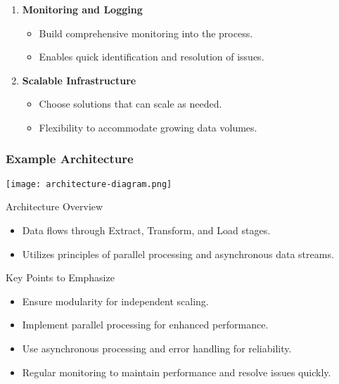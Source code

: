 \documentclass{beamer}
\begin{document}
\begin{frame}[fragile]
\begin{enumerate}
        \item \textbf{Monitoring and Logging}
            \begin{itemize}
                \item Build comprehensive monitoring into the process.
                \item Enables quick identification and resolution of issues.
            \end{itemize}
        
        \item \textbf{Scalable Infrastructure}
            \begin{itemize}
                \item Choose solutions that can scale as needed.
                \item Flexibility to accommodate growing data volumes.
            \end{itemize}
    \end{enumerate}
\end{frame}

\begin{frame}[fragile]
    \frametitle{Example Architecture}
    \begin{center}
        \texttt{[image: architecture-diagram.png]} %
    \end{center}
    \begin{block}{Architecture Overview}
    \begin{itemize}
        \item Data flows through Extract, Transform, and Load stages.
        \item Utilizes principles of parallel processing and asynchronous data streams.
    \end{itemize}

    \begin{block}{Key Points to Emphasize}
        \begin{itemize}
            \item Ensure modularity for independent scaling.
            \item Implement parallel processing for enhanced performance.
            \item Use asynchronous processing and error handling for reliability.
            \item Regular monitoring to maintain performance and resolve issues quickly.
        \end{itemize}
    \end{block}
    \end{block}
\end{frame}
\end{document}
